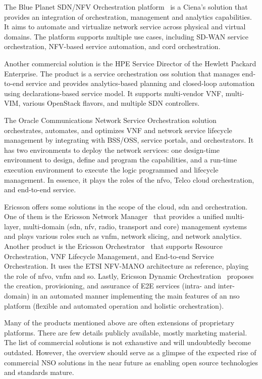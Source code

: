 The Blue Planet SDN/NFV Orchestration platform~\cite{BluePlanet2017BLUESUITE} is a Ciena's solution that provides an integration of orchestration, management and analytics capabilities. It aims to automate and virtualize network service across physical and virtual domains. The platform supports multiple use cases, including SD-WAN service orchestration, NFV-based service automation, and \gls{cord} orchestration.

Another commercial solution is the HPE Service Director of the Hewlett Packard Enterprise. The product is a service orchestration \gls{oss} solution that manages end-to-end service and provides analytics-based planning and closed-loop automation using declarations-based service model. It supports multi-vendor VNF, multi-VIM, various OpenStack flavors, and multiple SDN controllers.

The Oracle Communications Network Service Orchestration solution~\cite{OracleCommunicationsOracleSolution} orchestrates, automates, and optimizes VNF and network service lifecycle management by integrating with BSS/OSS, service portals, and orchestrators. It has two environments to deploy the network services: one design-time environment to design, define and program the capabilities, and a run-time execution environment to execute the logic programmed and lifecycle management. In essence, it plays the roles of the \gls{nfvo}, Telco cloud orchestration, and end-to-end service.  

Ericsson offers some solutions in the scope of the cloud, \gls{sdn} and orchestration. One of them is the Ericsson Network Manager~\cite{EricssonInc.EricssonManager} that provides a unified multi-layer, multi-domain (\gls{sdn}, \gls{nfv}, radio, transport and core) management systems and plays various roles such as \gls{vnfm}, network slicing, and network analytics. Another product is the Ericsson Orchestrator~\cite{EricssonOrchestrator} that supports Resource Orchestration, VNF Lifecycle Management, and End-to-end Service Orchestration. It uses the ETSI NFV-MANO architecture as reference, playing the role of \gls{nfvo}, \gls{vnfm} and \gls{so}. Lastly, Ericsson Dynamic Orchestration~\cite{DynamicOrchestrator} proposes the creation, provisioning, and assurance of E2E services (intra- and inter-domain) in an automated manner implementing the main features of an \gls{nso} platform (flexible and automated operation and holistic orchestration). 

Many of the products mentioned above are often extensions of proprietary platforms. There are few details publicly available, mostly marketing material. The list of commercial solutions is not exhaustive and will undoubtedly become outdated. However, the overview should serve as a glimpse of the expected rise of commercial NSO solutions in the near future as enabling open source technologies and standards mature.